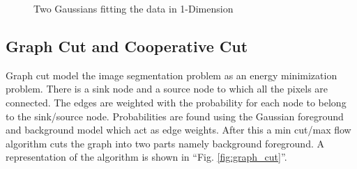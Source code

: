 \documentclass[conference]{IEEEtran}
\begin{document}
\begin{figure}[htbp]
\caption{Two Gaussians fitting the data in 1-Dimension}
\label{fig:gmm}
\end{figure}


\subsection{Graph Cut and Cooperative Cut} \label{gc}
Graph cut model the image segmentation problem as an energy minimization problem. There is a sink node and a source node to which all the pixels are connected. The edges are weighted with the probability for each node to belong to the sink/source node. Probabilities are found using the Gaussian foreground and background model which act as edge weights. After this a min cut/max flow algorithm cuts the graph into two parts namely background foreground. A representation of the algorithm is shown in ``Fig. \ref{fig:graph_cut}''.
\end{document}
